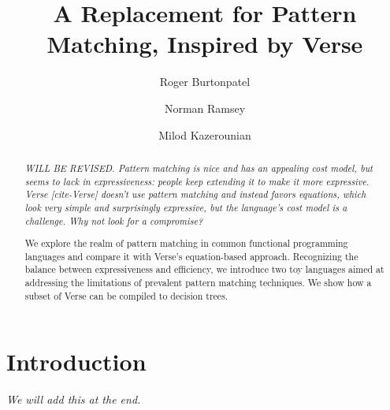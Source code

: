 \documentclass[manuscript,screen,review, 12pt]{acmart}
\begin{document}
\title{A Replacement for Pattern Matching, Inspired by Verse}

\author{Roger Burtonpatel}

\author{Norman Ramsey}

\author{Milod Kazerounian}

\renewcommand{\shortauthors}{Burtonpatel et al.}

\begin{abstract}
    \it{WILL BE REVISED.}
  Pattern matching is nice and has an appealing cost model, but seems to lack in
  expressiveness: people keep extending it to make it more expressive. Verse
  [cite-Verse] doesn't use pattern matching and instead favors equations, which
  look very simple and surprisingly expressive, but the language's cost model is
  a challenge. Why not look for a compromise? 
  

  We explore the realm of pattern matching in common functional programming
  languages and compare it with Verse's equation-based approach. Recognizing the
  balance between expressiveness and efficiency, we introduce two toy languages
  aimed at addressing the limitations of prevalent pattern matching techniques.
  We show how a subset of Verse can be compiled to decision trees. 

  \end{abstract}

\maketitle

\section{Introduction}
\it{We will add this at the end.}
\end{document}
